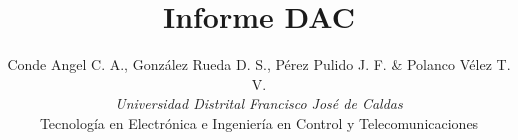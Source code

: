 \documentclass[11pt, a4paper]{article}
\title{\textbf{Informe DAC}}
\author{\small{Conde Angel C. A., González Rueda D. S., Pérez Pulido J. F. \& Polanco Vélez T. V.}\\ \small{\textit{Universidad Distrital Francisco José de Caldas}} \\ \small{Tecnología en Electrónica e Ingeniería en Control y Telecomunicaciones}}
\date{}
\begin{document}
\maketitle
\begin{multicols}{2}





\end{multicols}
\end{document}
